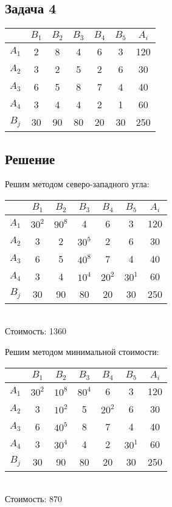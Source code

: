 \documentclass[12pt]{article}
\begin{document}
\subsection*{Задача 4}
\begin{table}[h!]
\begin{center}
\begin{tabular}{|c|c|c|c|c|c|c|}
\hline
           & $B_1$ & $B_2$ & $B_3$ & $B_4$ & $B_5$ & $A_i$	\\
\hline
 $A_1$ & 2 & 8 & 4 & 6 & 3 & 120	\\
\hline
 $A_2$ & 3 & 2 & 5 & 2 & 6 & 30	\\
\hline
 $A_3$ & 6 & 5 & 8 & 7 & 4 & 40	\\
\hline
 $A_4$ & 3 & 4 & 4 & 2 & 1 & 60	\\
\hline
 $B_j$ & 30 & 90 & 80 & 20 & 30 & 250	\\
\hline
\end{tabular}
\end{center}
\end{table} 
\subsection*{Решение}
Решим методом северо-западного угла:
\begin{table}[h!]
\begin{center}
\begin{tabular}{|c|c|c|c|c|c|c|}
\hline
           & $B_1$ & $B_2$ & $B_3$ & $B_4$ & $B_5$ & $A_i$	\\
\hline
 $A_1$ & $30^2$ & $90^8$ & 4 & 6 & 3 & 120	\\
\hline
 $A_2$ & 3 & 2 & $30^5$ & 2 & 6 & 30	\\
\hline
 $A_3$ & 6 & 5 & $40^8$ & 7 & 4 & 40	\\
\hline
 $A_4$ & 3 & 4 & $10^4$ & $20^2$ & $30^1$ & 60	\\
\hline
 $B_j$ & 30 & 90 & 80 & 20 & 30 & 250	\\
\hline
\end{tabular}\\

Стоимость: 1360
\end{center}
\end{table} 

Решим методом минимальной стоимости:
\begin{table}[h!]
\begin{center}
\begin{tabular}{|c|c|c|c|c|c|c|}
\hline
           & $B_1$ & $B_2$ & $B_3$ & $B_4$ & $B_5$ & $A_i$	\\
\hline
 $A_1$ & $30^2$ & $10^8$ & $80^4$ & 6 & 3 & 120	\\
\hline
 $A_2$ & 3 & $10^2$ & 5 & $20^2$ & 6 & 30	\\
\hline
 $A_3$ & 6 & $40^5$ & 8 & 7 & 4 & 40	\\
\hline
 $A_4$ & 3 & $30^4$ & 4 & 2 & $30^1$ & 60	\\
\hline
 $B_j$ & 30 & 90 & 80 & 20 & 30 & 250	\\
\hline
\end{tabular}\\
Стоимость: 870
\end{center}
\end{table} 
\end{document}

